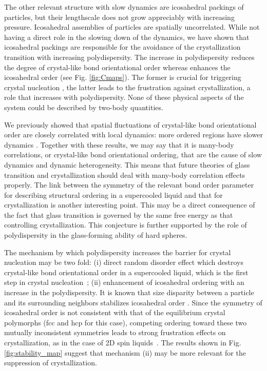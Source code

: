 \documentclass[twocolumn,superscriptaddress]{revtex4}
\begin{document}
The other relevant structure with slow dynamics are icosahedral packings of particles, but
their lengthscale does not grow appreciably with increasing pressure. Icosahedral assemblies of particles
are spatially uncorrelated. While not having a direct role in the slowing down of the dynamics, we
have shown that icosahedral packings are responsible for the avoidance of the crystallization transition
with increasing polydispersity.
The increase in polydispersity reduces the degree of crystal-like bond orientational order whereas enhances the icosahedral order (see Fig. \ref{fig:Cmaps}). 
The former is crucial for triggering 
crystal nucleation \cite{russo_hs}, the latter leads to the frustration against crystallization, a role that increases with polydispersity. None of these physical aspects of the system could be described by two-body quantities. 

We previously showed that spatial fluctuations of crystal-like bond orientational order are closely correlated with local dynamics: 
more ordered regions have slower dynamics \cite{KAT,WT,ShintaniNP,tanaka,Kawasaki3D,mathieu_icosahedra}. 
Together with these results, we may say that it is many-body correlations, or crystal-like bond orientational ordering, that 
are the cause of slow dynamics and dynamic heterogeneity.  
This means that future theories of glass transition and crystallization should deal with many-body correlation effects properly. 
The link between the symmetry of the relevant bond order parameter for describing structural ordering 
in a supercooled liquid and that for crystallization is another interesting point. 
This may be a direct consequence of the fact that glass transition is governed by the same free energy as that 
controlling crystallization. This conjecture is further supported by the role of 
polydispersity in the glass-forming ability of hard spheres.  

The mechanism by which polydispersity increases the barrier for crystal nucleation may be two fold: 
(i) direct random disorder effect which destroys crystal-like bond orientational order in a supercooled liquid,
which is the first step in crystal nucleation~\cite{russo_hs};
(ii) enhancement of icosahedral ordering with an increase in the polydispersity.
It is known that size disparity between a particle and its surrounding neighbors stabilizes icosahedral order \cite{Shimono2012}. 
Since the symmetry of icosahedral order is not consistent with that of the equilibrium crystal polymorphs (fcc and hcp for this case), 
competing ordering toward these two mutually inconsistent symmetries leads to strong frustration effects on crystallization, as in the case of 
2D spin liquids~\cite{ShintaniNP,STNM}. 
The results shown in Fig. \ref{fig:stability_map} suggest that mechanism (ii) may be more relevant for the suppression of crystallization. 
\end{document}
